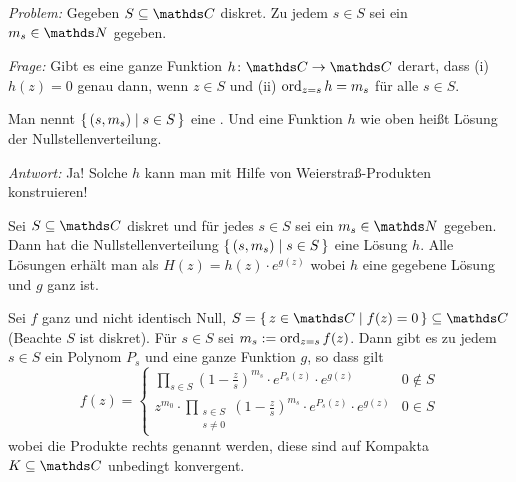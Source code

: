 \emph{Problem:} Gegeben $S\subseteq \CC$ diskret. Zu jedem $s\in S$ sei ein $m_s \in \NN$ gegeben.

\emph{Frage:} Gibt es eine ganze Funktion $h\colon \CC \ra \CC$ derart, dass (i) $h(z) = 0$ genau dann, wenn $z\in S$ und (ii) $\operatorname*{ord}_{z=s} h = m_s$ für alle $s \in S$.

Man nennt $\left\{\,(s, m_s) \mid s\in S\,\right\}$ eine .
Und eine Funktion $h$ wie oben heißt Lösung der Nullstellenverteilung.

\emph{Antwort:} Ja! Solche $h$ kann man mit Hilfe von Weierstraß-Produkten konstruieren!

\begin{satz-list}\label{satz:weierstrasprodukt}
\item Sei $S\subseteq \CC$ diskret und für jedes $s\in S$ sei ein $m_s \in \NN$ gegeben. Dann hat die Nullstellenverteilung $\left\{\,(s, m_s) \mid s\in S\,\right\}$ eine Lösung $h$.
Alle Lösungen erhält man als $H(z) = h(z)\cdot e^{g(z)}$ wobei $h$ eine gegebene Lösung und $g$ ganz ist.

\item Sei $f$ ganz und nicht identisch Null, $S=\Set{z\in\CC \mid f(z) = 0}\subseteq\CC$ (Beachte $S$ ist diskret).
Für $s\in S$ sei $m_s := \operatorname*{ord}_{z=s} f(z)$.
Dann gibt es zu jedem $s\in S$ ein Polynom $P_s$ und eine ganze Funktion $g$, so dass gilt
\[
	f(z) =
	\begin{cases}
		\displaystyle \prod_{s\in S} \left(1-\frac{z}{s}\right)^{m_s}\cdot e^{P_s(z)}\cdot e^{g(z)} & 0 \not\in S \\
		\displaystyle z^{m_0} \cdot \prod_{\substack{s\in S\\ \scriptscriptstyle s\not=0}} \left(1-\frac{z}{s}\right)^{m_s}\cdot e^{P_s(z)}\cdot e^{g(z)} & 0 \in S
	\end{cases}
\]
wobei die Produkte rechts  genannt werden, diese sind auf Kompakta $K\subseteq \CC$ unbedingt konvergent.
\end{satz-list}

